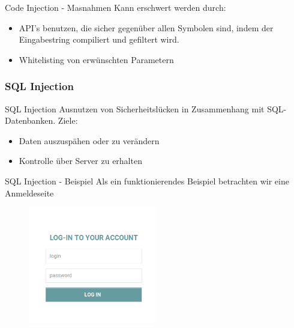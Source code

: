 \documentclass[10pt]{beamer}
\begin{document}
\begin{frame}[fragile]{Code Injection - Masnahmen}
  Kann erschwert werden durch:
  \begin{itemize}
    \item API's benutzen, die sicher gegen\"uber allen Symbolen sind, indem der Eingabestring compiliert und gefiltert wird.
    \item Whitelisting von erw\"unschten Parametern
  \end{itemize}
\end{frame}


\subsubsection{SQL Injection}

\begin{frame}[fragile]{SQL Injection}
  Ausnutzen von Sicherheitsl\"ucken in Zusammenhang mit SQL-Datenbanken.
  Ziele:
  \begin{itemize}
    \item Daten auszusp\"ahen oder zu ver\"andern
    \item Kontrolle \"uber Server zu erhalten
  \end{itemize}
\end{frame}


\begin{frame}[fragile]{SQL Injection - Beispiel}
  Als ein funktionierendes Beispiel betrachten wir eine Anmeldeseite
  \newline
  \begin{figure}[h]
    \centering
    \includegraphics[width=0.5\textwidth]{sql_ex_1}
  \end{figure}
\end{frame}
\end{document}
